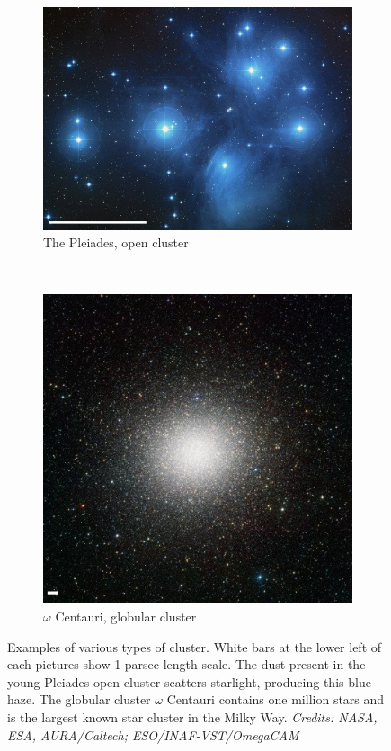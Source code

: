 \begin{figure}
    \centering
    \begin{subfigure}[b]{0.55\textwidth}
        \includegraphics[width=\textwidth]{Figures/0_Pleiades_scale.jpg}
        \caption{The Pleiades, open cluster}
        \label{Fig:0_openglobular1.open}
    \end{subfigure}
    ~ 
    \begin{subfigure}[b]{0.4\textwidth}
        \includegraphics[width=\textwidth]{Figures/0_omega_centauri_scale.jpg}
        \caption{$\omega$ Centauri, globular cluster}
        \label{Fig:0_openglobular1.glob}
    \end{subfigure}
     \caption[Example clusters I - The Pleiades and $\Omega$ Cen]{Examples of various types of cluster. White bars at the lower left of each pictures show 1 parsec length scale. The dust present in the young Pleiades open cluster scatters starlight, producing this blue haze. The globular cluster $\omega$ Centauri contains one million stars and is the largest known star cluster in the Milky Way. \textit{Credits: NASA, ESA, AURA/Caltech; ESO/INAF-VST/OmegaCAM}}
     \label{Fig:0_openglobular}
\end{figure}
